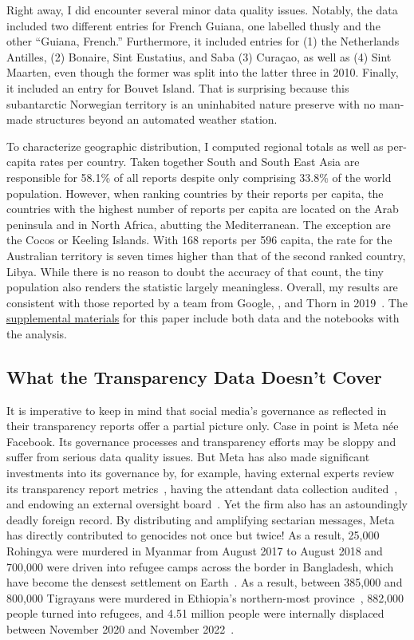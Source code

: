 Right away, I did encounter several minor data quality issues. Notably, the data
included two different entries for French Guiana, one labelled thusly and the
other ``Guiana, French.'' Furthermore, it included entries for (1) the
Netherlands Antilles, (2) Bonaire, Sint Eustatius, and Saba (3) Curaçao, as well
as (4) Sint Maarten, even though the former was split into the latter three in
2010. Finally, it included an entry for Bouvet Island. That is surprising
because this subantarctic Norwegian territory is an uninhabited nature preserve
with no man-made structures beyond an automated weather station.

To characterize geographic distribution, I computed regional totals as well as
per-capita rates per country. Taken together South and South East Asia are
responsible for 58.1\% of all reports despite only comprising 33.8\% of the
world population. However, when ranking countries by their reports per capita,
the countries with the highest number of reports per capita are located on the
Arab peninsula and in North Africa, abutting the Mediterranean. The exception are
the Cocos or Keeling Islands. With 168 reports per 596 capita, the rate for the
Australian territory is seven times higher than that of the second ranked
country, Libya. While there is no reason to doubt the accuracy of that count,
the tiny population also renders the statistic largely meaningless. Overall, my
results are consistent with those reported by a team from Google, \NCMEC, and
Thorn in 2019~\cite{BurszteinBrightea2019}. The
\href{https://github.com/apparebit/penal-colony}{supplemental materials} for
this paper include both data and the notebooks with the analysis.


\subsection{What the Transparency Data Doesn't Cover}
\label{sec:census-limits}

It is imperative to keep in mind that social media's governance as reflected in
their transparency reports offer a partial picture only. Case in point is Meta
n\'ee Facebook. Its governance processes and transparency efforts may be sloppy
and suffer from serious data quality issues. But Meta has also made significant
investments into its governance by, for example, having external experts review
its transparency report metrics~\cite{BradfordGriselea2019}, having the
attendant data collection audited~\cite{Sarang2022}, and endowing an external
oversight board~\cite{BoteroMarinoGreeneea2020}. Yet the firm also has an
astoundingly deadly foreign record. By distributing and amplifying sectarian
messages, Meta has directly contributed to genocides not once but twice! As a
result, 25,000 Rohingya were murdered in Myanmar from August 2017 to August 2018
and 700,000 were driven into refugee camps across the border in Bangladesh,
which have become the densest settlement on
Earth~\cite{DeGuzman2022,HumanRightsCouncil2018}. As a result, between 385,000
and 800,000 Tigrayans were murdered in Ethiopia's northern-most
province~\cite{AnnysVandenBemptea2021,ChothiaBekit2022}, 882,000 people turned
into refugees, and 4.51 million people were internally displaced between
November 2020 and November 2022~\cite{UNICEF2023}.

